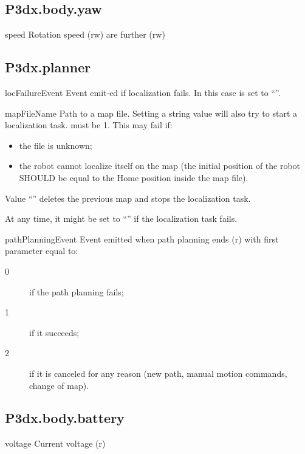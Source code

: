 \subsection{P3dx.body.yaw}
\begin{urbiscriptapi}
\item[speed] Rotation speed (rw) are further (rw)
\end{urbiscriptapi}

\subsection{P3dx.planner}
\begin{urbiscriptapi}
\item[locFailureEvent] Event emit-ed if localization fails. In this case
   is set to ``''.


\item[mapFileName] Path to a map file. Setting a string value will also try
  to start a localization task.  must be 1. This may fail
  if:
  \begin{itemize}
  \item the file is unknown;
  \item the robot cannot localize itself on the map (the initial position of
    the robot SHOULD be equal to the Home position inside the map file).
  \end{itemize}

  Value ``'' deletes the previous map and stops the localization task.

  At any time, it might be set to ``'' if the localization task fails.


\item[pathPlanningEvent] Event emitted when path planning ends (r) with first
  parameter equal to:
  \begin{sublist}
    \begin{description}
    \item[0] if the path planning fails;
    \item[1] if it succeeds;
    \item[2] if it is canceled for any reason (new path, manual motion
      commands, change of map).
    \end{description}
  \end{sublist}
\end{urbiscriptapi}

\subsection{P3dx.body.battery}
\begin{urbiscriptapi}
\item[voltage] Current voltage (r)
\end{urbiscriptapi}

